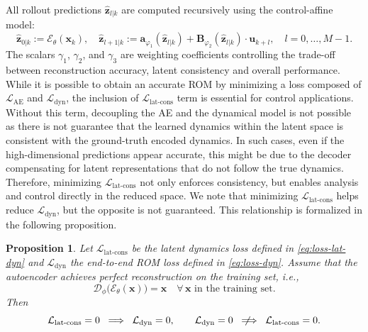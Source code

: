 \documentclass{article}
\newtheorem{proposition}{Proposition}
\newcommand{\notimplies}{%
  \mathrel{{\ooalign{\hidewidth$\not\phantom{=}$\hidewidth\cr$\implies$}}}}
\begin{document}
All rollout predictions $\hat{\mathbf{z}}_{l|k}$ are computed recursively using the control-affine model:
\begin{equation}
\label{eq:rollouts}
\hat{\mathbf{z}}_{0|k} := \mathcal{E}_\theta(\mathbf{x}_k), \quad
\hat{\mathbf{z}}_{l+1|k} := \mathbf{a}_{\varphi_1}(\hat{\mathbf{z}}_{l|k}) + \mathbf{B}_{\varphi_2}(\hat{\mathbf{z}}_{l|k})\cdot \mathbf{u}_{k+l}, \quad l = 0,\dots,M-1.
\end{equation}
The scalars $\gamma_1$, $\gamma_2$, and $\gamma_3$ are weighting coefficients controlling the trade-off between reconstruction accuracy, latent consistency and overall performance.
While it is possible to obtain an accurate ROM by minimizing a loss composed of $\mathcal{L}_{\text{AE}}$ and $\mathcal{L}_{\text{dyn}}$, the inclusion of $\mathcal{L}_{\text{lat-cons}}$ term is essential for control applications.
Without this term, decoupling the AE and the dynamical model is not possible as there is not guarantee that the learned dynamics within the latent space is consistent with the ground-truth encoded dynamics.
In such cases, even if the high-dimensional predictions appear accurate, this might be due to the decoder compensating for latent representations that do not follow the true dynamics.
Therefore, minimizing $\mathcal{L}_{\text{lat-cons}}$ not only enforces consistency, but enables analysis and control directly in the reduced space.
We note that minimizing $\mathcal{L}_{\text{lat-cons}}$ helps reduce $\mathcal{L}_{\text{dyn}}$, but the opposite is not guaranteed.
This relationship is formalized in the following proposition.

\begin{proposition}
    \label{prop:loss}
Let \(\mathcal{L}_{\mathrm{lat\text{-}cons}}\) be the latent dynamics loss defined in \eqref{eq:loss-lat-dyn} and \(\mathcal{L}_{\mathrm{dyn}}\) the end-to-end ROM loss defined in \eqref{eq:loss-dyn}.  Assume that the autoencoder achieves perfect reconstruction on the training set, i.e.,
\[
\mathcal{D}_\phi\bigl(\mathcal{E}_\theta(\mathbf{x})\bigr)=\mathbf{x}
\quad\forall\,\mathbf{x}\text{ in the training set}.
\]
Then
\[
\mathcal{L}_{\mathrm{lat\text{-}cons}}=0
\;\implies\;
\mathcal{L}_{\mathrm{dyn}}=0,
\qquad
\mathcal{L}_{\mathrm{dyn}}=0
\;\notimplies \;
\mathcal{L}_{\mathrm{lat\text{-}cons}}=0.
\]    
\end{proposition}
\end{document}

